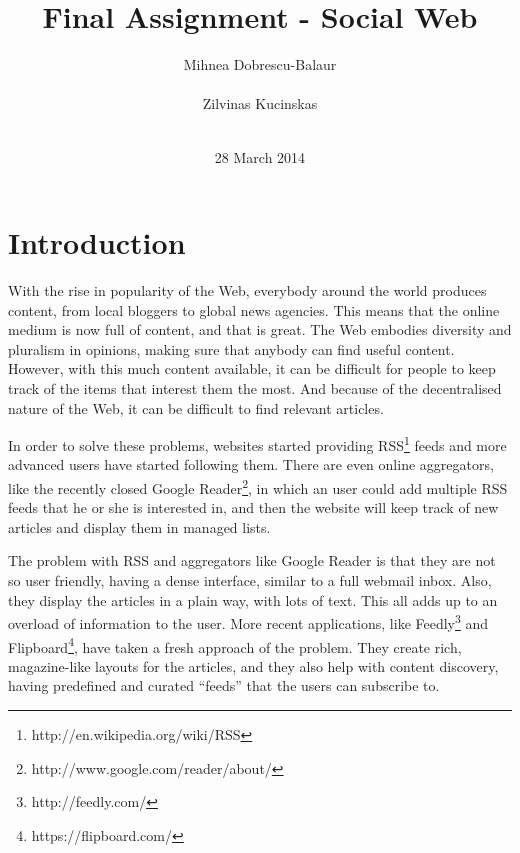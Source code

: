 \documentclass{acm_proc_10ptArticle-sp}
\begin{document}
\title{Final Assignment - Social Web}

\author{
%
\alignauthor Mihnea Dobrescu-Balaur\\
	\\
\alignauthor Zilvinas Kucinskas\\
	\\
}

\date{28 March 2014}
\maketitle

\section{Introduction}

With the rise in popularity of the Web, everybody around the world produces content, from local bloggers to global news agencies. This means that the online medium is now full of content, and that is great. The Web embodies diversity and pluralism in opinions, making sure that anybody can find useful content. However, with this much content available, it can be difficult for people to keep track of the items that interest them the most. And because of the decentralised nature of the Web, it can be difficult to find relevant articles.

In order to solve these problems, websites started providing RSS\footnote{http://en.wikipedia.org/wiki/RSS} feeds and more advanced users have started following them. There are even online aggregators, like the recently closed Google Reader\footnote{http://www.google.com/reader/about/}, in which an user could add multiple RSS feeds that he or she is interested in, and then the website will keep track of new articles and display them in managed lists.

The problem with RSS and aggregators like Google Reader is that they are not so user friendly, having a dense interface, similar to a full webmail inbox. Also, they display the articles in a plain way, with lots of text. This all adds up to an overload of information to the user. More recent applications, like Feedly\footnote{http://feedly.com/} and Flipboard\footnote{https://flipboard.com/}, have taken a fresh approach of the problem. They create rich, magazine-like layouts for the articles, and they also help with content discovery, having predefined and curated “feeds” that the users can subscribe to.
\end{document}
